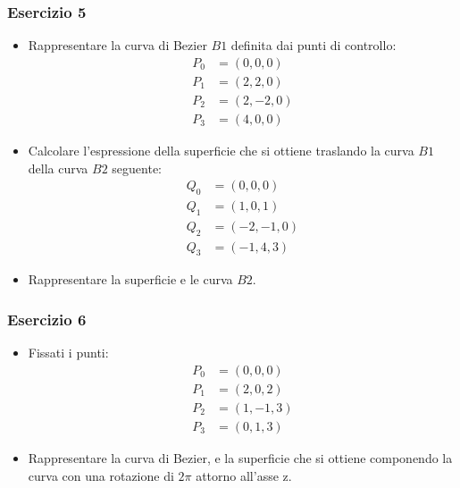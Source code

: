\documentclass{beamer}
\begin{document}
%
\begin{frame}
\frametitle{Esercizio 5}
\begin{itemize}
\item Rappresentare la curva  di Bezier $B1$ definita dai punti di controllo:
\begin{align}
P_0 &= (0,0,0 )\nonumber\\
P_1 &= (2,2,0 )\nonumber\\
P_2 &= (2,-2,0)\nonumber\\
P_3 &= (4,0,0 )\nonumber
\end{align}
\item Calcolare l'espressione della superficie che si ottiene traslando la curva $B1$  della curva $B2$ seguente:
\begin{align}
Q_0 &= (0,0,0)\nonumber\\
Q_1 &= (1,0,1)\nonumber\\
Q_2 &= (-2,-1,0)\nonumber\\
Q_3 &= (-1,4,3)\nonumber
\end{align}
\item Rappresentare la superficie e le curva $B2$.
\end{itemize}
\end{frame}
\begin{frame}
\frametitle{Esercizio 6}
\begin{itemize}
\item Fissati i punti:
\begin{align}
P_0 &= (0,0,0)\nonumber\\
P_1 &= (2,0,2)\nonumber\\
P_2 &= (1,-1,3)\nonumber\\
P_3 &= (0,1,3)\nonumber
\end{align}
\item Rappresentare la curva di Bezier, e la superficie che si ottiene componendo la curva con una rotazione di $2\pi$ attorno all'asse z.
\end{itemize}
\end{frame}
\end{document}
